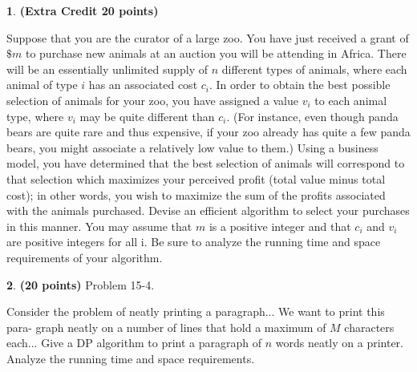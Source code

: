 \documentclass[11pt]{article}
\theoremstyle{definition}
\theoremstyle{theorem}
\newtheorem{prob}{}
\newcommand{\solution}{\medskip\noindent{\color{DarkBlue}\textbf{Solution:}}}
\begin{document}
\newpage
\begin{prob} \textbf{(Extra Credit 20 points)} 
\end{prob}

Suppose that you are the curator of a large zoo.  You have just received a grant of $\$m$ to purchase new animals at an auction you will be attending in Africa.  There will be an essentially unlimited supply of $n$ different types of animals, where  each  animal  of  type $i$ has  an  associated  cost $c_i$.   In  order  to  obtain  the  best possible selection of animals for your zoo, you have assigned a value $v_i$ to each animal type, where $v_i$ may be quite different than $c_i$.  (For instance, even though panda bears are quite rare and thus expensive,  if your zoo already has quite a few panda bears, you might associate a relatively low value to them.)  Using a business model, you have determined that the best selection of animals will correspond to that selection which maximizes  your  perceived  profit  (total  value  minus  total  cost);  in  other  words,  you wish to maximize the sum of the profits associated with the animals purchased. Devise an efficient algorithm to select your purchases in this manner.  You may assume that $m$ is a positive integer and that $c_i$ and $v_i$ are positive integers for all i.  Be sure to analyze the running time and space requirements of your algorithm.

\solution

\newpage
\begin{prob} \textbf{(20 points)} Problem 15-4.
\end{prob}

Consider the problem of neatly printing a paragraph... We want to print this para-
graph neatly on a number of lines that hold a maximum of $M$ characters each... Give a DP algorithm to print a paragraph of $n$ words neatly on a printer. Analyze the running time and space requirements.
\end{document}
